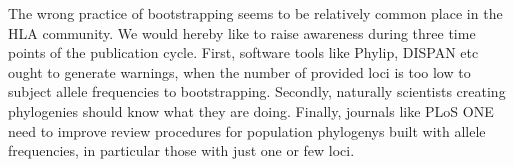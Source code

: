 The wrong practice of bootstrapping seems to be relatively common place in the HLA community.
We would hereby like to raise awareness during three time points of the publication cycle. First, software tools like
Phylip, DISPAN etc ought to generate warnings, when the number of provided loci is too low to subject allele frequencies to
bootstrapping. Secondly, naturally scientists creating phylogenies should know what they are doing. Finally, journals like
PLoS ONE need to improve review procedures for population phylogenys built with allele frequencies, in particular those with
just one or few loci.

